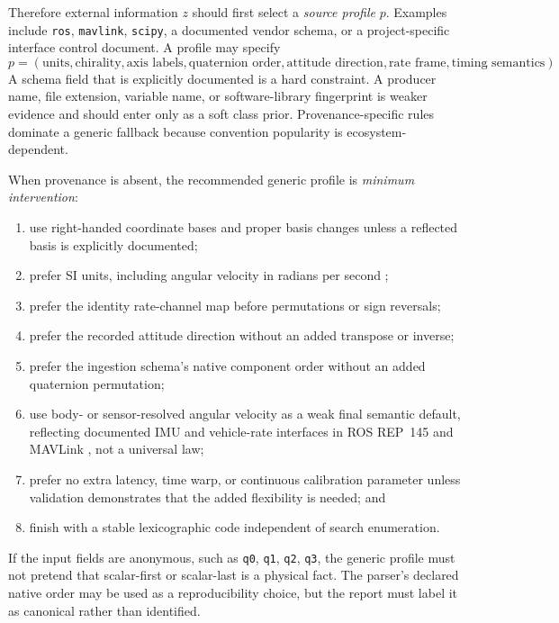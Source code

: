 \documentclass[11pt]{article}
\begin{document}
    Therefore external information $z$ should first select a \emph{source profile} $p$.
    Examples include \texttt{ros}, \texttt{mavlink}, \texttt{scipy}, a documented vendor
    schema, or a project-specific interface control document. A profile may specify
    \begin{equation}
        p=(\text{units},\text{chirality},\text{axis labels},\text{quaternion order},
        \text{attitude direction},\text{rate frame},\text{timing semantics}).
    \end{equation}
    A schema field that is explicitly documented is a hard constraint. A producer name,
    file extension, variable name, or software-library fingerprint is weaker evidence and
    should enter only as a soft class prior. Provenance-specific rules dominate a generic
    fallback because convention popularity is ecosystem-dependent.

    When provenance is absent, the recommended generic profile is
    \emph{minimum intervention}:
    \begin{enumerate}[nosep]
    \item use right-handed coordinate bases and proper basis changes unless a reflected
    basis is explicitly documented;
    \item prefer SI units, including angular velocity in radians per second
    \cite{bipmSI};
    \item prefer the identity rate-channel map before permutations or sign reversals;
    \item prefer the recorded attitude direction without an added transpose or inverse;
    \item prefer the ingestion schema's native component order without an added
    quaternion permutation;
    \item use body- or sensor-resolved angular velocity as a weak final semantic default,
    reflecting documented IMU and vehicle-rate interfaces in ROS REP~145 and
    MAVLink \cite{rosrep145,mavlinkCommon}, not a universal law;
    \item prefer no extra latency, time warp, or continuous calibration parameter unless
    validation demonstrates that the added flexibility is needed; and
    \item finish with a stable lexicographic code independent of search enumeration.
    \end{enumerate}
    If the input fields are anonymous, such as \texttt{q0}, \texttt{q1}, \texttt{q2},
    \texttt{q3}, the generic profile must not pretend that scalar-first or scalar-last is a
    physical fact. The parser's declared native order may be used as a reproducibility
    choice, but the report must label it as canonical rather than identified.
\end{document}

